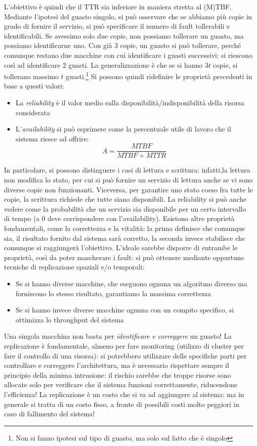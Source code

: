 L'obiettivo è quindi che il TTR sia inferiore in maniera stretta al (M)TBF.
Mediante l'ipotesi del guasto singolo, si può osservare che se abbiamo più 
copie in grado di fornire il servizio, si
può specificare il numero di fault tollerabili e identificabili. Se avessimo 
solo due copie, non possiamo tollerare un
guasto, ma possiamo identificarne uno. Con già 3 copie, un guasto si può 
tollerare,
perché comunque restano due macchine con cui identificare i guasti successivi:
si riescono così ad identificare 2 guasti. La generalizzazione è che se si
hanno $3t$ copie, si tollerano massimo $t$ guasti.\footnote{Non si fanno ipotesi
sul tipo di guasto, ma solo sul fatto che è singolo} Si possono quindi
ridefinire le proprietà precedenti in base a questi valori:
\begin{itemize}
 \item La \textit{reliability} è il valor medio sulla
 disponibilità/indisponibilità della risorsa considerata
 \item L'\textit{availability} si può esprimere come la percentuale utile di
lavoro che il sistema riesce ad offrire:
 \begin{equation}
  A = \frac{MTBF}{MTBF + MTTR}
 \end{equation}
\end{itemize}
In particolare, si possono distinguere i casi di lettura e scrittura: infatti,la
lettura non modifica lo stato, per cui si può fornire un servizio di lettura
anche se vi sono diverse copie non funzionanti. Viceversa, per garantire uno
stato coeso fra tutte le copie, la scrittura richiede che tutte siano 
disponibili.
La reliability si può anche vedere come la probabilità che un servizio sia
disponibile per un certo intervallo di tempo (a 0 deve corrispondere con
l'availability).
Esistono altre proprietà fondamentali, come la correttezza e la vitalità: la
prima definisce che comunque sia, il risultato fornito dal sistema sarà
corretto, la seconda invece stabilisce che comunque si raggiungerà l'obiettivo.
L'ideale sarebbe disporre di entrambe le proprietà, così da poter mascherare i
fault: si può ottenere mediante oppurtune tecniche di replicazione spaziali e/o
temporali:
\begin{itemize}
 \item Se si hanno diverse macchine, che eseguono ognuna un algoritmo diverso ma
 forniscono lo stesso risultato, garantiamo la massima correttezza
 \item Se si hanno invece diverse macchine ognuna con un compito specifico, si
 ottimizza lo throughput del sistema
\end{itemize}
Una singola macchina non basta per \textit{identificare e correggere} un guasto!
La replicazione è fondamentale, almeno per fare monitoring (utilizzo di cluster
per fare il controllo di una risorsa): si potrebbero utilizzare delle specifiche
parti per controllare e correggere l'architettura, ma è necessario rispettare
sempre il principio della minima intrusione: il rischio sarebbe che troppe
risorse sono allocate solo per verificare che il sistema funzioni correttamente,
riducendone l'efficienza! La replicazione è un costo che si va ad aggiungere al
sistema: ma in generale si tratta di un costo fisso, a fronte di possibili costi
molto peggiori in caso di fallimento del sistema!
